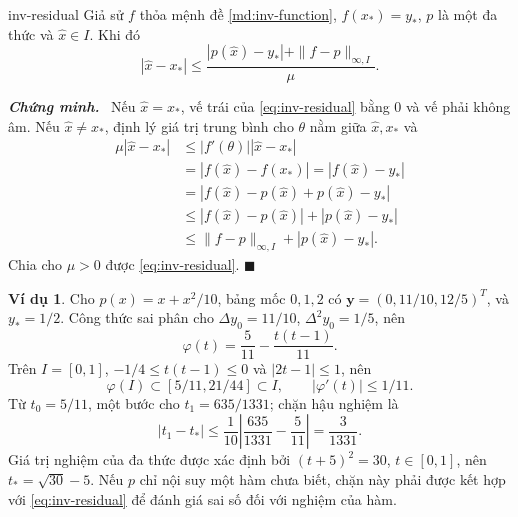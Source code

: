 \documentclass[12pt,a4paper,oneside]{book}
\numberwithin{algorithm}{chapter}
\theoremstyle{definition}
\newtheorem{vidu}{Ví dụ}[chapter]
\newenvironment{chungminh}{\par\medskip\noindent\textbf{\textit{\color{mainblue}Chứng minh.}}\ }{\hfill$\blacksquare$\par\medskip}
\begin{document}
\begin{menhde}{}{inv-residual}
Giả sử $f$ thỏa mệnh đề \ref{md:inv-function}, $f(x_\ast)=y_\ast$, $p$ là một đa thức và $\widehat x\in I$. Khi đó
\begin{equation}\label{eq:inv-residual}
 |\widehat x-x_\ast|
 \leq\frac{|p(\widehat x)-y_\ast|+\|f-p\|_{\infty,I}}{\mu}.
\end{equation}
\end{menhde}
\begin{chungminh}
Nếu $\widehat x=x_\ast$, vế trái của \eqref{eq:inv-residual} bằng $0$ và vế phải không âm. Nếu $\widehat x\ne x_\ast$, định lý giá trị trung bình cho $\theta$ nằm giữa $\widehat x,x_\ast$ và
\begin{align*}
 \mu|\widehat x-x_\ast|
 &\leq|f'(\theta)||\widehat x-x_\ast|\\
 &=|f(\widehat x)-f(x_\ast)|=|f(\widehat x)-y_\ast|\\
 &=|f(\widehat x)-p(\widehat x)+p(\widehat x)-y_\ast|\\
 &\leq|f(\widehat x)-p(\widehat x)|+|p(\widehat x)-y_\ast|\\
 &\leq\|f-p\|_{\infty,I}+|p(\widehat x)-y_\ast|.
\end{align*}
Chia cho $\mu>0$ được \eqref{eq:inv-residual}.
\end{chungminh}

\begin{vidu}
Cho $p(x)=x+x^2/10$, bảng mốc $0,1,2$ có $\boldsymbol y=(0,11/10,12/5)^T$, và $y_\ast=1/2$. Công thức sai phân cho $\Delta y_0=11/10$, $\Delta^2y_0=1/5$, nên
\[
 \varphi(t)=\frac5{11}-\frac{t(t-1)}{11}.
\]
Trên $I=[0,1]$, $-1/4\leq t(t-1)\leq0$ và $|2t-1|\leq1$, nên
\[
 \varphi(I)\subset[5/11,21/44]\subset I,\qquad
 |\varphi'(t)|\leq1/11.
\]
Từ $t_0=5/11$, một bước cho $t_1=635/1331$; chặn hậu nghiệm là
\[
 |t_1-t_\ast|\leq\frac1{10}\left|\frac{635}{1331}-\frac5{11}\right|
 =\frac3{1331}.
\]
Giá trị nghiệm của đa thức được xác định bởi $(t+5)^2=30$, $t\in[0,1]$, nên $t_\ast=\sqrt{30}-5$. Nếu $p$ chỉ nội suy một hàm chưa biết, chặn này phải được kết hợp với \eqref{eq:inv-residual} để đánh giá sai số đối với nghiệm của hàm.
\end{vidu}


\end{document}
